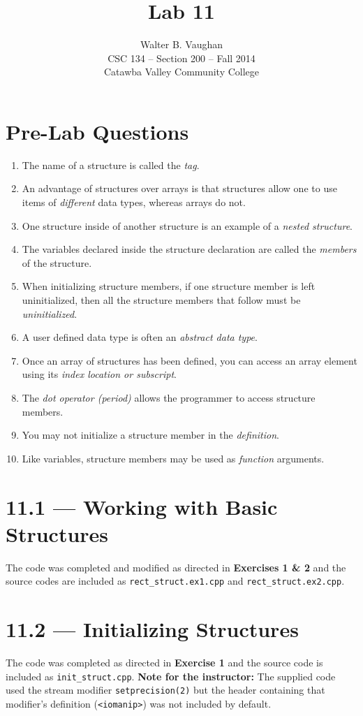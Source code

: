\documentclass[11pt]{article}
\author{Walter B. Vaughan\\
        \small CSC 134 -- Section 200 -- Fall 2014\\
        \small Catawba Valley Community College}
\title{Lab 11}
\date{\vspace{-5ex}}
\begin{document}
\maketitle


\section*{Pre-Lab Questions}
\begin{enumerate}
    \item The name of a structure is called the \emph{tag}.
    \item An advantage of structures over arrays is that structures allow one to use items of \emph{different} data types, whereas arrays do not.
    \item One structure inside of another structure is an example of a \emph{nested structure}.
    \item The variables declared inside the structure declaration are called the \emph{members} of the structure.
    \item When initializing structure members, if one structure member is left uninitialized, then all the structure members that follow must be \emph{uninitialized}.
    \item A user defined data type is often an \emph{abstract data type}.
    \item Once an array of structures has been defined, you can access an array element using its \emph{index location or subscript}.
    \item The \emph{dot operator (period)} allows the programmer to access structure members.
    \item You may not initialize a structure member in the \emph{definition}.
    \item Like variables, structure members may be used as \emph{function} arguments.
\end{enumerate}
\newpage

\section*{11.1 --- Working with Basic Structures}
    The code was completed and modified as directed in \textbf{Exercises 1 \& 2} and the source codes are included as \texttt{rect\_struct.ex1.cpp} and \texttt{rect\_struct.ex2.cpp}.

\section*{11.2 --- Initializing Structures}
    The code was completed as directed in \textbf{Exercise 1} and the source code is included as \texttt{init\_struct.cpp}. \textbf{Note for the instructor:} The supplied code used the stream modifier \lstinline{setprecision(2)} but the header containing that modifier's definition (\lstinline{<iomanip>}) was not included by default.
\end{document}
